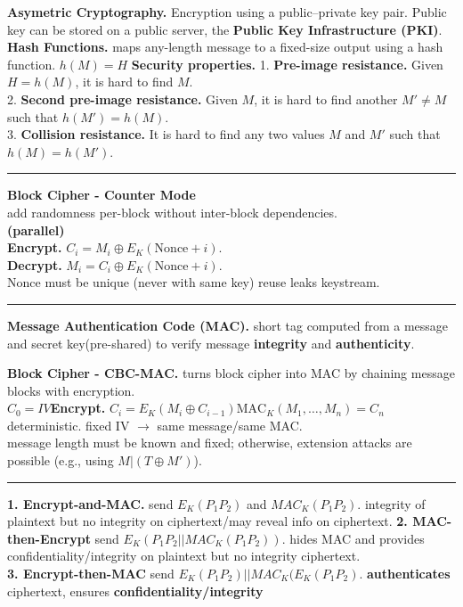 \documentclass[9pt, a4paper]{extarticle}
\makeatletter
\let\oldwarning\warning
\renewcommand{\warning}{\raisebox{0.3ex}{\oldwarning}}
\renewcommand{\hline}{\noalign{\vskip 2px}\hrule\@height\arrayrulewidth\@width\linewidth\noalign{\vskip 2px}}
\makeatother
\begin{document}
\begin{minipage}[t]{0.495\textwidth}
	\textbf{Asymetric Cryptography.} Encryption using a public–private key pair. Public key can be stored on a public server, the \textbf{Public Key Infrastructure (PKI)}.\\
	\textbf{Hash Functions.} maps any-length message to a fixed-size output using a hash function. $h(M) = H$
	\textbf{Security properties.}
	1. \textbf{Pre-image resistance.} Given $H = h(M)$, it is hard to find $M$.\\
	2. \textbf{Second pre-image resistance.} Given $M$, it is hard to find another $M' \ne M$ such that $h(M') = h(M)$.\\
	3. \textbf{Collision resistance.} It is hard to find any two values $M$ and $M'$ such that $h(M) = h(M')$.
	\hline
	\begin{minipage}[t]{0.35\textwidth}
		\textbf{Block Cipher - Counter Mode}\\add randomness per-block without inter-block dependencies. \\\textbf{(parallel)}\\
		\textbf{Encrypt.} $C_i = M_i \oplus E_K(\text{Nonce}+i)$.\\
		\textbf{Decrypt.} $M_i = C_i \oplus E_K(\text{Nonce}+i)$.\\
		Nonce must be unique (never with same key) reuse leaks keystream.\hline
		\textbf{Message Authentication Code (MAC).} short tag computed from a message and secret key(pre-shared) to verify message \textbf{integrity} and \textbf{authenticity}.\\
	\end{minipage}
	\begin{minipage}[t]{0.65\textwidth}
		\textbf{Block Cipher - CBC-MAC.} turns block cipher into MAC by chaining message blocks with encryption.\\
		$C_0 = IV $\;\textbf{Encrypt.} $C_i = E_K(M_i \oplus C_{i-1})$\;$\text{MAC}_K(M_1, \ldots, M_n) = C_n$\\
		deterministic. fixed IV $\rightarrow$ same message/same MAC.\\
		\warning message length must be known and fixed; otherwise, extension attacks are possible (e.g., using $M | (T \oplus M')$).
		\hline
		\textbf{1. Encrypt-and-MAC.} send $E_K(P_1P_2)$ and $MAC_K(P_1P_2)$. integrity of plaintext but no integrity on ciphertext/may reveal info on ciphertext. \textbf{2. MAC-then-Encrypt} send $E_K(P_1P_2||MAC_K(P_1P_2))$. hides MAC and provides confidentiality/integrity on plaintext but no integrity ciphertext.\\
		\textbf{3. Encrypt-then-MAC} send $E_K(P_1P_2)||MAC_K(E_K(P_1P_2)$. \textbf{authenticates} ciphertext, ensures \textbf{confidentiality/integrity} \checkmark
	\end{minipage}
\end{minipage}
\end{document}

